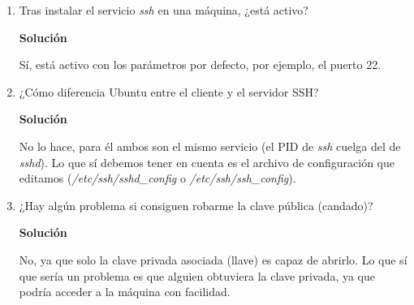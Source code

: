 \documentclass[12pt,spanish]{article}
\newenvironment{solution}{
	\par
	\textbf{Solución}
	\par
	\begin{center}
}
{
	\end{center}
}
\begin{document}
\begin{enumerate}
	\item Tras instalar el servicio \textit{ssh} en una máquina, ¿está activo?
	\begin{solution}
		Sí, está activo con los parámetros por defecto, por ejemplo, el puerto 22.
	\end{solution}
	\item ¿Cómo diferencia Ubuntu entre el cliente y el servidor SSH?
	\begin{solution}
		No lo hace, para él ambos son el mismo servicio (el PID de \textit{ssh} cuelga del de \textit{sshd}). Lo que sí debemos tener en cuenta es el archivo de configuración que editamos (\textit{/etc/ssh/sshd\_config} o \textit{/etc/ssh/ssh\_config}).
	\end{solution}
	\item ¿Hay algún problema si consiguen robarme la clave pública (candado)?
	\begin{solution}
		No, ya que solo la clave privada asociada (llave) es capaz de abrirlo. Lo que sí que sería un problema es que alguien obtuviera la clave privada, ya que podría acceder a la máquina con facilidad.
	\end{solution}
\end{enumerate}
\end{document}
